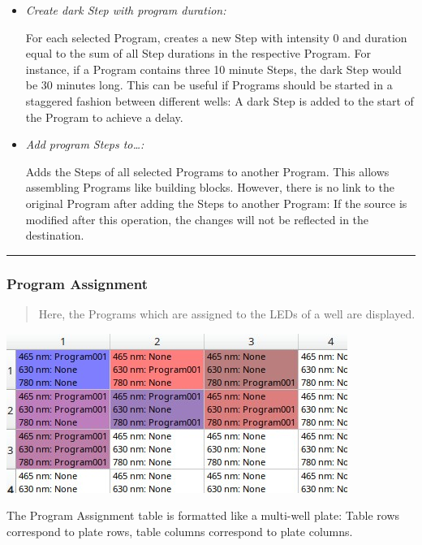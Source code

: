 \begin{itemize}
\item
  \emph{Create dark Step with program duration:}

  For each selected Program, creates a new Step with intensity 0 and
  duration equal to the sum of all Step durations in the respective
  Program. For instance, if a Program contains three 10 minute Steps,
  the dark Step would be 30 minutes long. This can be useful if Programs
  should be started in a staggered fashion between different wells: A
  dark Step is added to the start of the Program to achieve a delay.
\item
  \emph{Add program Steps to\ldots:}

  Adds the Steps of all selected Programs to another Program. This
  allows assembling Programs like building blocks. However, there is no
  link to the original Program after adding the Steps to another
  Program: If the source is modified after this operation, the changes
  will not be reflected in the destination.
\end{itemize}

\begin{center}\rule{0.5\linewidth}{0.5pt}\end{center}

\hypertarget{program-assignment}{%
\subsubsection{Program Assignment}\label{program-assignment}}

\begin{quote}
Here, the Programs which are assigned to the LEDs of a well are
displayed.
\end{quote}

\includegraphics{images/well_colors.jpg}

The Program Assignment table is formatted like a multi-well plate: Table
rows correspond to plate rows, table columns correspond to plate
columns.

